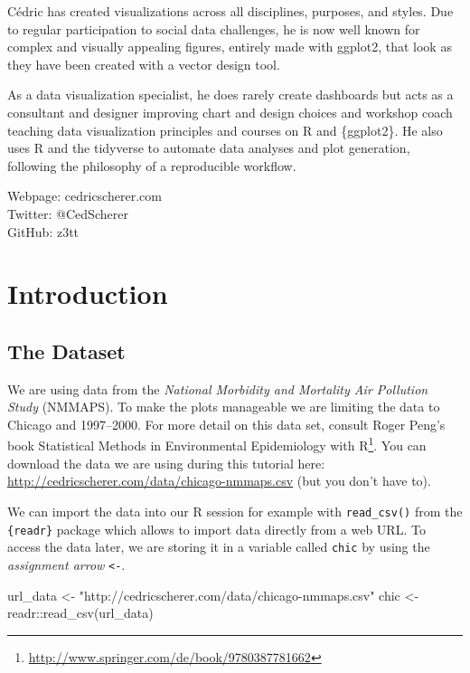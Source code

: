 \documentclass[
]{krantz}
\makeatletter
\newenvironment{Shaded}{\begin{snugshade}}{\end{snugshade}}
\newcommand{\FunctionTok}[1]{\textcolor[rgb]{0,0,0}{#1}}
\newcommand{\NormalTok}[1]{#1}
\newcommand{\OtherTok}[1]{\textcolor[rgb]{0.37,0.37,0.37}{#1}}
\newcommand{\SpecialCharTok}[1]{\textcolor[rgb]{0,0,0}{#1}}
\newcommand{\StringTok}[1]{\textcolor[rgb]{0.5,0.5,0.5}{#1}}
\renewcommand{\href}[2]{#2\footnote{\url{#1}}}
\newenvironment{kframe}{%
\medskip{}
\setlength{\fboxsep}{.8em}
 \def\at@end@of@kframe{}%
 \ifinner\ifhmode%
  \def\at@end@of@kframe{\end{minipage}}%
  \begin{minipage}{\columnwidth}%
 \fi\fi%
 \def\FrameCommand##1{\hskip\@totalleftmargin \hskip-\fboxsep
 \colorbox{shadecolor}{##1}\hskip-\fboxsep
     \hskip-\linewidth \hskip-\@totalleftmargin \hskip\columnwidth}%
 \MakeFramed {\advance\hsize-\width
   \@totalleftmargin\z@ \linewidth\hsize
   \@setminipage}}%
 {\par\unskip\endMakeFramed%
 \at@end@of@kframe}
\renewenvironment{Shaded}{\begin{kframe}}{\end{kframe}}
\makeatother
\begin{document}
Cédric has created visualizations across all disciplines, purposes, and styles. Due to regular participation to social data challenges, he is now well known for complex and visually appealing figures, entirely made with ggplot2, that look as they have been created with a vector design tool.

As a data visualization specialist, he does rarely create dashboards but acts as a consultant and designer improving chart and design choices and workshop coach teaching data visualization principles and courses on R and \{ggplot2\}. He also uses R and the tidyverse to automate data analyses and plot generation, following the philosophy of a reproducible workflow.

Webpage: cedricscherer.com\\
Twitter: @CedScherer\\
GitHub: z3tt

\mainmatter

\hypertarget{introduction}{%
\chapter{Introduction}\label{introduction}}

\hypertarget{data}{%
\section{The Dataset}\label{data}}

We are using data from the \emph{National Morbidity and Mortality Air Pollution Study} (NMMAPS). To make the plots manageable we are limiting the data to Chicago and 1997--2000. For more detail on this data set, consult Roger Peng's book \href{http://www.springer.com/de/book/9780387781662}{Statistical Methods in Environmental Epidemiology with R}.
You can download the data we are using during this tutorial here: \url{http://cedricscherer.com/data/chicago-nmmaps.csv} (but you don't have to).

We can import the data into our R session for example with \texttt{read\_csv()} from the \texttt{\{readr\}} package which allows to import data directly from a web URL. To access the data later, we are storing it in a variable called \texttt{chic} by using the \emph{assignment arrow} \texttt{\textless{}-}.

\begin{Shaded}
\begin{Highlighting}[]
\NormalTok{url\_data }\OtherTok{\textless{}{-}} \StringTok{"http://cedricscherer.com/data/chicago{-}nmmaps.csv"}
\NormalTok{chic }\OtherTok{\textless{}{-}}\NormalTok{ readr}\SpecialCharTok{::}\FunctionTok{read\_csv}\NormalTok{(url\_data)}
\end{Highlighting}
\end{Shaded}
\end{document}
